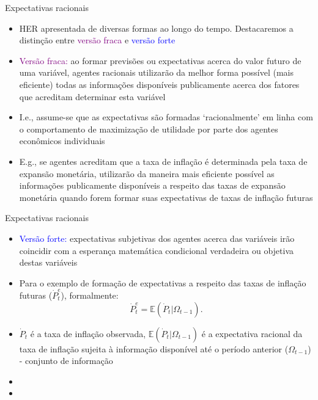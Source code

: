\documentclass[10pt]{beamer}
\begin{document}
\begin{frame}{Expectativas racionais}
    \begin{itemize}
        \item HER apresentada de diversas formas ao longo do tempo. Destacaremos a distinção entre \textcolor{purple}{versão fraca} e \textcolor{blue}{versão forte}
        \bigskip        
        \item \textcolor{purple}{Versão fraca:} ao formar previsões ou expectativas acerca do valor futuro de uma variável, agentes racionais utilizarão da melhor forma possível (mais eficiente) todas as informações disponíveis publicamente acerca dos fatores que acreditam determinar esta variável
        \bigskip
        \item I.e., assume-se que as expectativas são formadas `racionalmente' em linha com o comportamento de maximização de utilidade por parte dos agentes econômicos individuais
        \bigskip
        \item E.g., se agentes acreditam que a taxa de inflação é determinada pela taxa de expansão monetária, utilizarão da maneira mais eficiente possível as informações publicamente disponíveis a respeito das taxas de expansão monetária quando forem formar suas expectativas de taxas de inflação futuras
    \end{itemize}
\end{frame}

\begin{frame}{Expectativas racionais}
    \begin{itemize}
        \item \textcolor{blue}{Versão forte:} expectativas subjetivas dos agentes acerca das variáveis irão coincidir com a esperança matemática condicional verdadeira ou objetiva destas variáveis
        \bigskip
        \item Para o exemplo de formação de expectativas a respeito das taxas de inflação futuras ($\dot{P}_t^e$), formalmente:
        \begin{equation}
            \dot{P}_t^e = \mathbb{E}(\dot{P}_t|\Omega_{t-1}).
            \label{eq1}
        \end{equation}
        \bigskip
        \item $\dot{P}_t$ é a taxa de inflação observada, $\mathbb{E}(\dot{P}_t|\Omega_{t-1})$ é a expectativa racional da taxa de inflação sujeita à informação disponível até o período anterior ($\Omega_{t-1}$) - conjunto de informação
        \bigskip
        \item {}
        \bigskip
        \item {}
    \end{itemize}
\end{frame}
\end{document}
